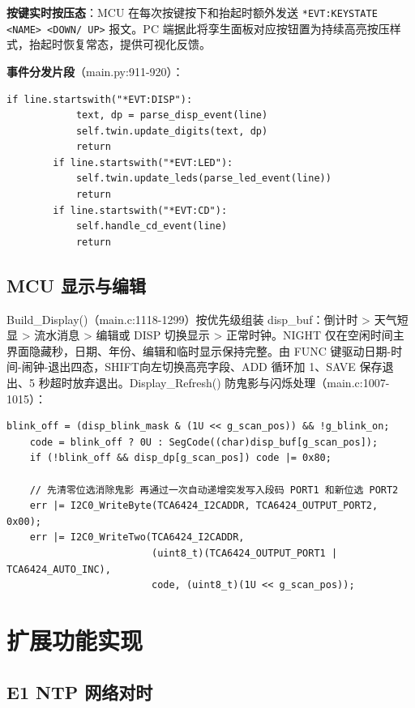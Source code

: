 \documentclass[11pt,a4paper]{article}
\begin{document}
\textbf{按键实时按压态}：MCU 在每次按键按下和抬起时额外发送 \texttt{*EVT:KEYSTATE <NAME> <DOWN/ UP>} 报文。PC 端据此将孪生面板对应按钮置为持续高亮按压样式，抬起时恢复常态，提供可视化反馈。

\textbf{事件分发片段}（main.py:911-920）：
\begin{lstlisting}[style=pystyle]
        if line.startswith("*EVT:DISP"):
            text, dp = parse_disp_event(line)
            self.twin.update_digits(text, dp)
            return
        if line.startswith("*EVT:LED"):
            self.twin.update_leds(parse_led_event(line))
            return
        if line.startswith("*EVT:CD"):
            self.handle_cd_event(line)
            return
\end{lstlisting}

\subsection{MCU 显示与编辑}

Build\_Display()（main.c:1118-1299）按优先级组装 disp\_buf：倒计时 > 天气短显 > 流水消息 > 编辑或 DISP 切换显示 > 正常时钟。NIGHT 仅在空闲时间主界面隐藏秒，日期、年份、编辑和临时显示保持完整。由 FUNC 键驱动日期-时间-闹钟-退出四态，SHIFT向左切换高亮字段、ADD 循环加 1、SAVE 保存退出、5 秒超时放弃退出。Display\_Refresh() 防鬼影与闪烁处理（main.c:1007-1015）：
\begin{lstlisting}[style=cstyle]
    blink_off = (disp_blink_mask & (1U << g_scan_pos)) && !g_blink_on;
    code = blink_off ? 0U : SegCode((char)disp_buf[g_scan_pos]);
    if (!blink_off && disp_dp[g_scan_pos]) code |= 0x80;

    // 先清零位选消除鬼影 再通过一次自动递增突发写入段码 PORT1 和新位选 PORT2
    err |= I2C0_WriteByte(TCA6424_I2CADDR, TCA6424_OUTPUT_PORT2, 0x00);
    err |= I2C0_WriteTwo(TCA6424_I2CADDR,
                         (uint8_t)(TCA6424_OUTPUT_PORT1 | TCA6424_AUTO_INC),
                         code, (uint8_t)(1U << g_scan_pos));
\end{lstlisting}

\section{扩展功能实现}

\subsection{E1 NTP 网络对时}
\end{document}
